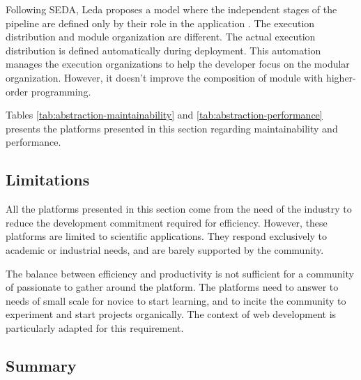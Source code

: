 Following SEDA, Leda proposes a model where the independent stages of the pipeline are defined only by their role in the application \cite{Salmito2013,Salmito2014}.
The execution distribution and module organization are different.
The actual execution distribution is defined automatically during deployment. %
This automation manages the execution organizations to help the developer focus on the modular organization.
However, it doesn't improve the composition of module with higher-order programming.

\separator

Tables \ref{tab:abstraction-maintainability} and \ref{tab:abstraction-performance} presents the platforms presented in this section regarding maintainability and performance.





\subsection{Limitations}

All the platforms presented in this section come from the need of the industry to reduce the development commitment required for efficiency.
However, these platforms are limited to scientific applications.
They respond exclusively to academic or industrial needs, and are barely supported by the community.

The balance between efficiency and productivity is not sufficient for a community of passionate to gather around the platform.
The platforms need to answer to needs of small scale for novice to start learning, and to incite the community to experiment and start projects organically.
The context of web development is particularly adapted for this requirement.


\subsection{Summary}

